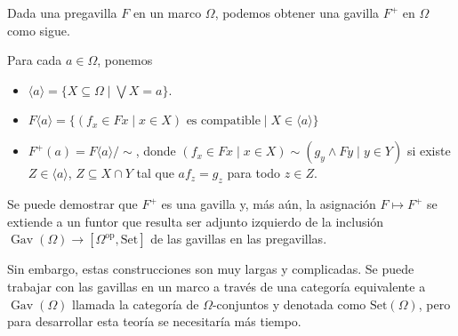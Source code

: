 \documentclass[12pt,letterpaper,titlepage]{article}
\theoremstyle{definition}
\newcommand\Sup{\bigvee}
\renewcommand\inf{\wedge}
\newcommand\simr{{\sim}}
\newcommand\<{\langle}
\renewcommand\>{\rangle}
\newcommand{\Con}{\mathrm{Set}}
\newcommand{\op}{\mathrm{op}}
\DeclareMathOperator{\Gav}{Gav}
\begin{document}
Dada una pregavilla $F$ en un marco $\Omega$,
podemos obtener una gavilla $F^+$ en $\Omega$ como sigue.

Para cada $a\in\Omega$, ponemos
\begin{itemize}
    \item
    $\<a\> = \{X\subseteq\Omega\mid\Sup X=a\}$.
    \item
    $F\<a\>
    = \{(f_x\in Fx\mid x\in X)\text{ es compatible}\mid X\in\<a\>\}$
    \item
    $F^+(a)=F\<a\>/\simr$,
    donde $(f_x\in Fx\mid x\in X)\sim(g_y\inf Fy\mid y\in Y)$
    si existe $Z\in\<a\>$, $Z\subseteq X\cap Y$ tal que
    $af_z=g_z$ para todo $z\in Z$.
\end{itemize}
Se puede demostrar que $F^+$ es una gavilla y, más aún,
la asignación $F\mapsto F^+$ se extiende a un funtor
que resulta ser adjunto izquierdo
de la inclusión $\Gav(\Omega)\to[\Omega^\op,\Con]$
de las gavillas en las pregavillas.

Sin embargo, estas construcciones son muy largas y complicadas.
Se puede trabajar con las gavillas en un marco a través
de una categoría equivalente a $\Gav(\Omega)$ llamada la categoría
de $\Omega$-conjuntos y denotada como $\Con(\Omega)$,
pero para desarrollar esta teoría se necesitaría más tiempo.
\end{document}
